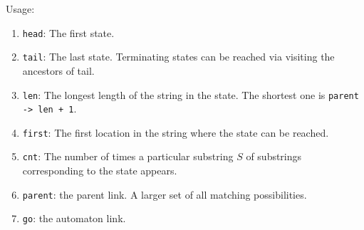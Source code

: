 Usage:
\begin{enumerate}
\item \texttt{head}: The first state.
\item \texttt{tail}: The last state. Terminating states can be reached via visiting the ancestors of tail.
\item \texttt{len}: The longest length of the string in the state. The shortest one is \texttt{parent -> len + 1}.
\item \texttt{first}: The first location in the string where the state can be reached.
\item \texttt{cnt}: The number of times a particular substring $S$ of substrings corresponding to the state appears.
\item \texttt{parent}: the parent link. A larger set of all matching possibilities.
\item \texttt{go}: the automaton link.
\end{enumerate}


